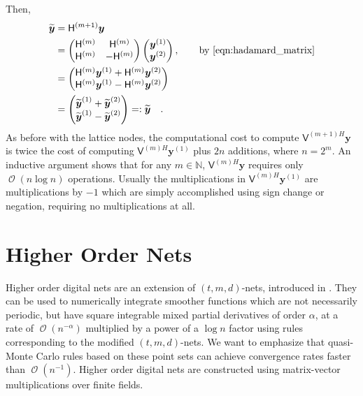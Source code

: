 \documentclass{svjour3}                     %
\DeclareMathOperator{\Order}{{\mathcal O}}
\newcommand{\bm}[1]{\boldsymbol{#1}}
\newcommand{\naturals}{\mathbb{N}}
\newcommand{\vy}{\bm{y}}
\newcommand{\mH}{\mathsf{H}}
\newcommand{\mV}{\mathsf{V}}
\begin{document}
Then,
\begin{align*}
\widetilde{\vy} &= \mH^{({m+1})} {\vy} \\
& = \begin{pmatrix}
\mH^{(m)} & \mH^{(m)} \\ \mH^{(m)} & - \mH^{(m)}
\end{pmatrix} 
\begin{pmatrix}
\vy^{(1)} \\ \vy^{(2)}
\end{pmatrix}, \qquad \text{by \eqref{eqn:hadamard_matrix}} \\
&= 
\begin{pmatrix}
\mH^{(m)} \vy^{(1)} + \mH^{(m)} \vy^{(2)} \\ 
\mH^{(m)} \vy^{(1)} - \mH^{(m)} \vy^{(2)}
\end{pmatrix}\\
&= 
\begin{pmatrix}
\widetilde{\vy}^{(1)} + \widetilde {\vy}^{(2)} \\ 
\widetilde {\vy}^{(1)} - \widetilde {\vy}^{(2)}
\end{pmatrix} =: \widetilde{\vy} \quad.
\end{align*}
As before with the lattice nodes, the computational cost to compute $\mV^{(m+1)H} \vy$ is 
twice the cost of computing $\mV^{(m)H} \vy^{(1)}$ plus $2n$ additions, where $n=2^m$. An inductive argument shows that for any $m \in \naturals$, $\mV^{(m)H}\vy$ requires only $\Order(n \log n)$ operations. Usually the multiplications in $\mV^{(m)H} \vy^{(1)}$ are multiplications by $-1$ which are simply accomplished using sign change or negation, requiring no multiplications at all.


\section{Higher Order Nets}

Higher order digital nets are an extension of $(t,m,d)$-nets, introduced in \cite{Dic08a}. They can be used to numerically integrate smoother functions which are not necessarily periodic, but have square integrable mixed partial derivatives of order $\alpha$, at a rate of $\Order(n^{-\alpha})$ multiplied by a power of a $\log n$ factor using rules corresponding to the modified $(t,m, d)$-nets.
We want to emphasize that quasi-Monte Carlo rules based on these point sets can achieve convergence rates faster than $\Order(n^{-1})$. 
Higher order digital nets are constructed using matrix-vector multiplications over finite
fields. 
\end{document}
